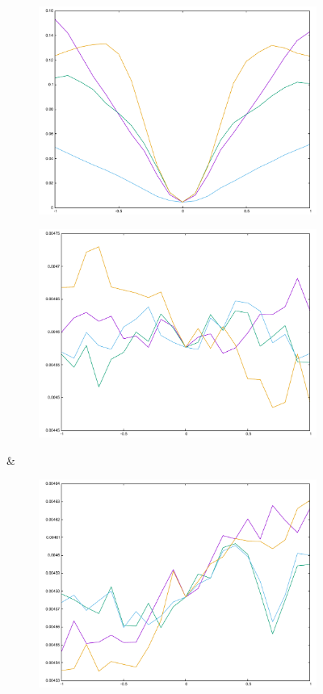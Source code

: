 \begin{figure}[H]
\begin{subfigure}{.33\textwidth}
	\includegraphics[width=\linewidth]{fig/ajherr/t3r/L_chi.pdf}
\end{subfigure}%
\begin{subfigure}{.33\textwidth}
	\includegraphics[width=\linewidth]{fig/ajherr/t3r/M_chi.pdf}
\end{subfigure}&
\begin{subfigure}{.33\textwidth}
	\includegraphics[width=\linewidth]{fig/ajherr/t3r/S_chi.pdf}

\end{subfigure}
\end{figure}
